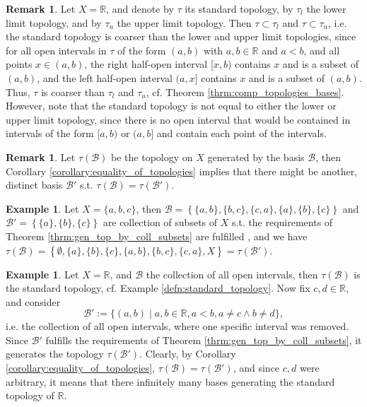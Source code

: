 \documentclass[12pt, a4paper]{article}
\numberwithin{equation}{section}
\theoremstyle{definition}
\theoremstyle{definition}
\newtheorem{exmp}[thm]{Example} %
\newtheorem{remark}[thm]{Remark} %
\begin{document}
		\begin{remark}
			Let $X = \mathbb R$, and denote by $\tau$ its standard topology, by $\tau_l$ the lower limit topology, and by $\tau_u$ the upper limit topology. Then $\tau\subset \tau_l$ and $\tau\subset \tau_u$, i.e. the standard topology is coarser than the lower and upper limit topologies, since for all open intervals in $\tau$ of the form $(a, b)$ with $a, b\in\mathbb R$ and $a < b$, and all points $x\in (a, b)$, the right half-open interval $[x, b)$ contains $x$ and is a subset of $(a, b)$, and the left half-open interval $(a, x]$ contains $x$ and is a subset of $(a, b)$. Thus, $\tau$ is coarser than $\tau_l$ and $\tau_u$, cf. Theorem \ref{thrm:comp_topologies_bases}. However, note that the standard topology is not equal to either the lower or upper limit topology, since there is no open interval that would be contained in intervals of the form $[a, b)$ or $(a, b]$ and contain each point of the intervals.
		\end{remark}
	
		\begin{remark}
			Let $\tau(\mathscr B)$ be the topology on $X$ generated by the basis $\mathscr B$, then Corollary \ref{corollary:equality_of_topologies} implies that there might be another, distinct basis $\mathscr B'$ s.t. $\tau(\mathscr B) = \tau(\mathscr B')$.
		\end{remark}
	
		\begin{exmp}
			Let $X = \{ a, b, c \}$, then $\mathscr B = \left\{ \{a, b\}, \{b, c \}, \{c, a\}, \{a\}, \{b\}, \{c\}\right\}$ and $\mathscr B' = \left\{ \{a\}, \{b\}, \{c\} \right\}$ are collection of subsets of $X$ s.t. the requirements of Theorem \ref{thrm:gen_top_by_coll_subsets} are fulfilled \cite{1333309}, and we have $\tau(\mathscr B) = \left\{ \emptyset, \{a\}, \{b\}, \{c\}, \{a, b\}, \{b, c\}, \{c, a\}, X \right\} = \tau(\mathscr B')$.
		\end{exmp}
	
		\begin{exmp}
			Let $X=\mathbb R$, and $\mathscr B$ the collection of all open intervals, then $\tau(\mathscr B)$ is the standard topology, cf. Example \ref{defn:standard_topology}. Now fix $c, d\in\mathbb R$, and consider $$\mathscr B' := \{(a, b) \mid a,b\in\mathbb R, a < b, a\ne c \wedge b\ne d\},$$ i.e. the collection of all open intervals, where one specific interval was removed. Since $\mathscr B'$ fulfills the requirements of Theorem \ref{thrm:gen_top_by_coll_subsets}, it generates the topology $\tau(\mathscr B')$. Clearly, by Corollary \ref{corollary:equality_of_topologies}, $\tau(\mathscr B) = \tau(\mathscr B')$, and since $c, d$ were arbitrary, it means that there infinitely many bases generating the standard topology of $\mathbb R$.
		\end{exmp}
	
\end{document}

